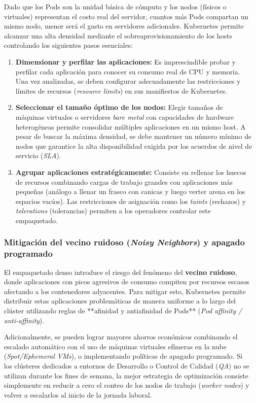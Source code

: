 Dado que los Pods son la unidad básica de cómputo y los nodos (físicos o virtuales) representan el costo real del servidor, cuantos más Pods compartan un mismo nodo, menor será el gasto en servidores adicionales. Kubernetes permite alcanzar una alta densidad mediante el sobreaprovisionamiento de los hosts controlando los siguientes pasos esenciales:

\begin{enumerate}
    \item \textbf{Dimensionar y perfilar las aplicaciones:} Es imprescindible probar y perfilar cada aplicación para conocer su consumo real de CPU y memoria. Una vez analizadas, se deben configurar adecuadamente las restricciones y límites de recursos (\textit{resource limits}) en sus manifiestos de Kubernetes.
    \item \textbf{Seleccionar el tamaño óptimo de los nodos:} Elegir tamaños de máquinas virtuales o servidores \textit{bare metal} con capacidades de hardware heterogéneas permite consolidar múltiples aplicaciones en un mismo host. A pesar de buscar la máxima densidad, se debe mantener un número mínimo de nodos que garantice la alta disponibilidad exigida por los acuerdos de nivel de servicio (\textit{SLA}).
    \item \textbf{Agrupar aplicaciones estratégicamente:} Consiste en rellenar los huecos de recursos combinando cargas de trabajo grandes con aplicaciones más pequeñas (análogo a llenar un frasco con canicas y luego verter arena en los espacios vacíos). Las restricciones de asignación como los \textit{taints} (rechazos) y \textit{tolerations} (tolerancias) permiten a los operadores controlar este empaquetado.
\end{enumerate}

\subsubsection{Mitigación del vecino ruidoso (\textit{Noisy Neighbors}) y apagado programado}
El empaquetado denso introduce el riesgo del fenómeno del \textbf{vecino ruidoso}, donde aplicaciones con picos agresivos de consumo compiten por recursos escasos afectando a los contenedores adyacentes. Para mitigar esto, Kubernetes permite distribuir estas aplicaciones problemáticas de manera uniforme a lo largo del clúster utilizando reglas de **afinidad y antiafinidad de Pods** (\textit{Pod affinity / anti-affinity}). 



Adicionalmente, se pueden lograr mayores ahorros económicos combinando el escalado automático con el uso de máquinas virtuales efímeras en la nube (\textit{Spot/Ephemeral VMs}), o implementando políticas de apagado programado. Si los clústeres dedicados a entornos de Desarrollo o Control de Calidad (\textit{QA}) no se utilizan durante los fines de semana, la mejor estrategia de optimización consiste simplemente en reducir a cero el conteo de los nodos de trabajo (\textit{worker nodes}) y volver a escalarlos al inicio de la jornada laboral.

